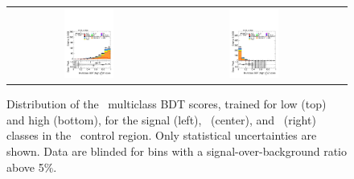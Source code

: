 \begin{figure}[htbp]
\begin{tabular}{ccc}
      \includegraphics[width=0.32\textwidth]{images/sr_cr_plots/plot_tth_ttbar_multiclass_gt200_hh_tth_cr_ttbar.pdf} &
      \includegraphics[width=0.32\textwidth]{images/sr_cr_plots/plot_tth_Z_multiclass_gt200_hh_tth_cr_ttbar.pdf} \\
    \end{tabular}
    
    \caption{Distribution of the \ttH\ multiclass BDT scores, trained for low \pth (top) 
    and high \pth (bottom), for the signal (left), \ttbar\ (center), and \ztautau\ (right) 
    classes in the \ttbar\ control region. Only statistical uncertainties are shown. 
    Data are blinded for bins with a signal-over-background ratio above 5\%.}
    \label{fig:bdt_ttbar}
    \end{figure}

